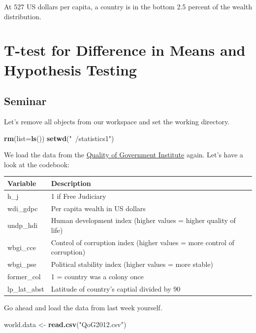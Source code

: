 \documentclass[]{article}
\newenvironment{Shaded}{\begin{snugshade}}{\end{snugshade}}
\newcommand{\KeywordTok}[1]{\textcolor[rgb]{0.13,0.29,0.53}{\textbf{#1}}}
\newcommand{\DataTypeTok}[1]{\textcolor[rgb]{0.13,0.29,0.53}{#1}}
\newcommand{\StringTok}[1]{\textcolor[rgb]{0.31,0.60,0.02}{#1}}
\newcommand{\NormalTok}[1]{#1}
\theoremstyle{definition}
\theoremstyle{definition}
\theoremstyle{definition}
\theoremstyle{remark}
\begin{document}
At 527 US dollars per capita, a country is in the bottom 2.5 percent of
the wealth distribution.

\section{T-test for Difference in Means and Hypothesis
Testing}\label{t-test-for-difference-in-means-and-hypothesis-testing}

\subsection{Seminar}\label{seminar-3}

Let's remove all objects from our workspace and set the working
directory.

\begin{Shaded}
\begin{Highlighting}[]
\KeywordTok{rm}\NormalTok{(}\DataTypeTok{list=}\KeywordTok{ls}\NormalTok{())}
\KeywordTok{setwd}\NormalTok{(}\StringTok{"~/statistics1"}\NormalTok{)}
\end{Highlighting}
\end{Shaded}

We load the data from the \href{http://qog.pol.gu.se/}{Quality of
Government Institute} again. Let's have a look at the codebook:

\begin{tabular}{l|l}
\hline
Variable & Description\\
\hline
h\_j & 1 if Free Judiciary\\
\hline
wdi\_gdpc & Per capita wealth in US dollars\\
\hline
undp\_hdi & Human development index (higher values = higher quality of life)\\
\hline
wbgi\_cce & Control of corruption index (higher values = more control of corruption)\\
\hline
wbgi\_pse & Political stability index (higher values = more stable)\\
\hline
former\_col & 1 = country was a colony once\\
\hline
lp\_lat\_abst & Latitude of country's captial divided by 90\\
\hline
\end{tabular}

Go ahead and load the data from last week yourself.

\begin{Shaded}
\begin{Highlighting}[]
\NormalTok{world.data <-}\StringTok{ }\KeywordTok{read.csv}\NormalTok{(}\StringTok{"QoG2012.csv"}\NormalTok{)}
\end{Highlighting}
\end{Shaded}
\end{document}
